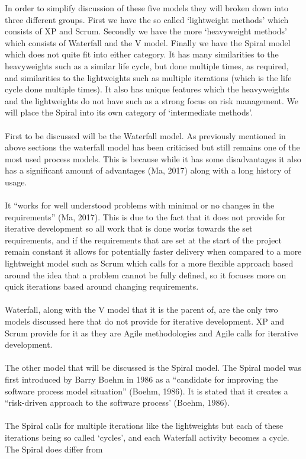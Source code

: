 \documentclass{CRPITStyle}
\begin{document}
		In order to simplify discussion of these five models they will broken down into three different groups. First we have the so called `lightweight
		methods' which consists of XP and Scrum. Secondly we have the more `heavyweight methods' which consists of Waterfall and the V model. Finally
		we have the Spiral model which does not quite fit into either category. It has many similarities to the heavyweights such as a similar life cycle, but
		done multiple times, as required, and similarities to the lightweights such as multiple iterations (which is the life cycle done multiple times). It also
		has unique features which the heavyweights and the lightweights do not have such as a strong focus on risk management. We will place the
		Spiral into its own category of `intermediate methods'.\\
		~\\
		First to be discussed will be the Waterfall model. As previously mentioned in above sections the waterfall model has been criticised
		but still remains one of the most used process models.
		This is because while it has some disadvantages it also has a significant amount of advantages (Ma, 2017) along with a long history of usage.\\
		~\\
		It ``works for well understood problems with minimal or no changes in the requirements'' (Ma, 2017). This is due to the fact that
		it does not provide for iterative development so all work that is done works towards the set requirements, and if the requirements
		that are set at the start of the project remain constant it allows for potentially faster delivery when compared to a more lightweight
		model such as Scrum which calls for a more flexible approach based around the idea that a problem cannot be fully defined, so it focuses
		more on quick iterations based around changing requirements.\\
		~\\
		Waterfall, along with the V model that it is the parent of, are the only two models discussed here that do not provide for iterative
		development. XP and Scrum provide for it as they are Agile methodologies and Agile calls for iterative development.\\
		~\\
		 The other model that will be discussed is the Spiral model. The Spiral model was first introduced by Barry Boehm in 
		 1986 as a ``candidate for improving the software process model situation'' (Boehm, 1986). It is stated that it creates a ``risk-driven
		 approach to the software process' (Boehm, 1986).\\
		 ~\\
		The Spiral calls for multiple iterations like the lightweights but each of these iterations being so called `cycles', and each Waterfall
		activity becomes a cycle. The Spiral does differ from
\end{document}

